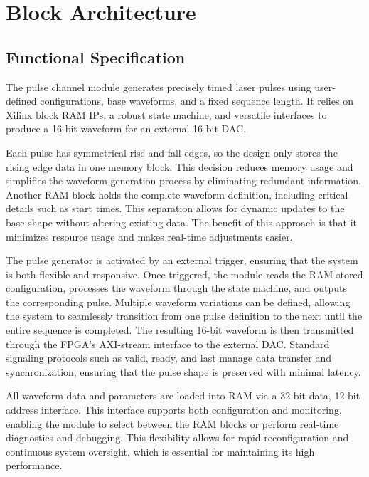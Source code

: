 \chapter{Block Architecture}
\section{Functional Specification}

The pulse channel module generates precisely timed laser pulses using user-defined configurations, base waveforms, and a fixed sequence length. It relies on Xilinx block RAM IPs, a robust state machine, and versatile interfaces to produce a 16-bit waveform for an external 16-bit DAC.

Each pulse has symmetrical rise and fall edges, so the design only stores the rising edge data in one memory block. This decision reduces memory usage and simplifies the waveform generation process by eliminating redundant information. Another RAM block holds the complete waveform definition, including critical details such as start times. This separation allows for dynamic updates to the base shape without altering existing data. The benefit of this approach is that it minimizes resource usage and makes real-time adjustments easier.

The pulse generator is activated by an external trigger, ensuring that the system is both flexible and responsive. Once triggered, the module reads the RAM-stored configuration, processes the waveform through the state machine, and outputs the corresponding pulse. Multiple waveform variations can be defined, allowing the system to seamlessly transition from one pulse definition to the next until the entire sequence is completed. The resulting 16-bit waveform is then transmitted through the FPGA's AXI-stream interface to the external DAC. Standard signaling protocols such as valid, ready, and last manage data transfer and synchronization, ensuring that the pulse shape is preserved with minimal latency.

All waveform data and parameters are loaded into RAM via a 32-bit data, 12-bit address interface. This interface supports both configuration and monitoring, enabling the module to select between the RAM blocks or perform real-time diagnostics and debugging. This flexibility allows for rapid reconfiguration and continuous system oversight, which is essential for maintaining its high performance.

